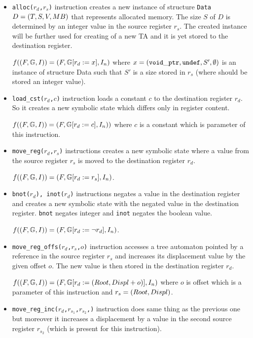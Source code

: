 \begin{itemize}

	\item {\tt alloc($r_d$,$r_s$)} instruction creates a new instance of structure {\tt Data} $D = (T,S,V,MB)$
		that represents allocated memory.
		The size $S$ of $D$ is determined by an integer value in the source register $r_s$.
		The created instance will be further used for creating of a new TA
		and it is yet stored to the destination register.
		
		$f((F, \mathbb{G}, I)) = (F, 
		\mathbb{G} [
			r_{d} := x], I_n)$
		where $x=({\tt void\_ptr},{\tt undef},S',\emptyset)$ is an instance of structure Data
		such that $S'$ is a size stored in $r_s$ (where should be stored an integer value). 

	\item {\tt load\_cst($r_d$,$c$)} instruction loads a constant $c$ to the destination register $r_d$.
		So it creates a new symbolic state which differs only in register content.
		
		$f((F, \mathbb{G}, I)) = (F, \mathbb{G} [r_d := c], I_n))$ where
		$c$ is a constant which is parameter of this instruction.
	
	\item {\tt move\_reg($r_d$,$r_s$)} instructions creates a new symbolic state where
		a value from the source register $r_s$ is moved to the destination register $r_d$.
		
		$f((F, \mathbb{G}, I)) = (F, \mathbb{G} [r_d := r_s], I_n)$.
	
	\item {\tt bnot($r_d$), inot($r_d$)} instructions negates a value in the destination register and
		creates a new symbolic state with the negated value in the destination register.
		{\tt bnot} negates integer and {\tt inot} negates the boolean value.
		
		$f((F, \mathbb{G}, I)) = (F, \mathbb{G} [r_d := \neg r_d], I_n)$.
	
	\item {\tt move\_reg\_offs($r_d$,$r_s$,$o$)} instruction accesses a tree automaton pointed
		by a reference in the source register $r_s$ and increases its displacement value by the given offset $o$.
		The new value is then stored in the destination register $r_d$.
		
		$f((F, \mathbb{G}, I)) = (F, \mathbb{G} [r_d := (Root,Displ+o)], I_n)$
		where $o$ is offset which is a parameter of this instruction
		and $r_s=(Root,Displ)$.
	
	\item {\tt move\_reg\_inc($r_d$,$r_{s_1}$,$r_{s_2}$,)} instruction does same thing as the previous one but moreover
		it increases a displacement by a value in the second source register $r_{s_2}$ (which is
		present for this instruction).
		

\end{itemize}
